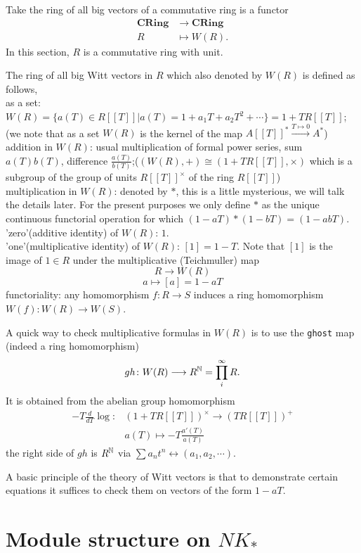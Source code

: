 Take the ring of all big vectors of a commutative ring is a functor 
\begin{align*}
\mathbf{CRing} &\longrightarrow \mathbf{CRing}\\
 R &\mapsto W(R).
\end{align*}
In this section, $R$ is a commutative ring with unit.
\begin{definition}
The ring of all big Witt vectors in $R$ which also denoted by $W(R)$ is defined as follows,\\
as a set: $W(R)=\{a(T)\in R[[T]]| a(T)=1+a_1T+a_2T^2+\cdots\}=1+TR[[T]]$; (we note that as a set $W(R)$ is the kernel of the map $A[[T]]^*\overset{T\mapsto 0}\longrightarrow A^*$)\\
addition in $W(R)$: usual multiplication of formal power series, sum $a(T)b(T)$, difference $\frac{a(T)}{b(T)}$;($(W(R),+)\cong (1+TR[[T]],\times)$ which is a subgroup of the group of units $R[[T]]^{\times}$ of the ring $R[[T]]$)\\
multiplication in $W(R)$: denoted by $*$, this is a little mysterious, we will talk the details later. For the present purposes we only define $*$ as the unique continuous functorial operation for which $(1-aT)*(1-bT)=(1-abT)$.\\
'zero'(additive identity) of $W(R)$: $1$.\\
'one'(multiplicative identity) of $W(R)$: $[1]=1-T$. Note that $[1]$ is the image of $1\in R$ under the multiplicative (Teichmuller) map 
\[R\longrightarrow W(R)\]
\[a \mapsto [a]=1-aT\]
functoriality: any homomorphism $f\colon R \longrightarrow S$ induces a ring homomorphism 
$W(f)\colon W(R) \longrightarrow W(S)$.
\end{definition}
A quick way to check multiplicative formulas in $W(R)$ is to use the \texttt{ghost} map (indeed a ring homomorphism)
\[gh\colon W(R)\longrightarrow R^{\mathbb{N}} =\prod_i^\infty R. \]
It is obtained from the abelian group homomorphism
\begin{align*}
-T \frac{d}{dT}\log \colon& (1+TR[[T]])^{\times} \longrightarrow (TR[[T]])^+\\
& a(T)\mapsto -T \frac{a'(T)}{a(T)}
\end{align*}
the right side of $gh$ is $R^{\mathbb{N}}$ via $\sum a_nt^n \longleftrightarrow (a_1,a_2,\cdots)$.

A basic principle of the theory of Witt vectors is that to demonstrate certain equations it suffices to check them on vectors of the form $1-aT$.
\section{Module structure on $NK_*$} %
\label{sec:module_structure_on_}
